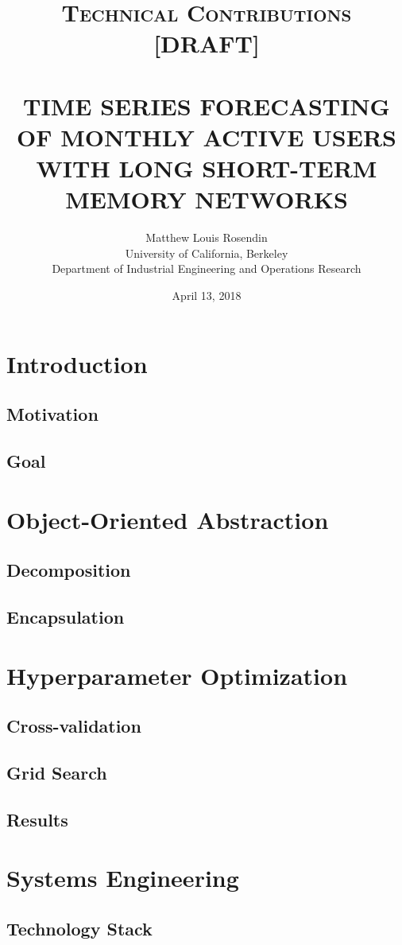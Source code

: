 \documentclass[11pt, oneside]{article}
\title{
  \normalsize \textsc{Technical Contributions [DRAFT]} \\ [2.0cm]
  \HRule{0.5pt} \\
  \LARGE \textbf{\uppercase{
    Time Series Forecasting of Monthly Active Users with Long Short-Term Memory
    Networks
  }}
  \HRule{2pt} \\ [0.5cm]
  \vspace*{5\baselineskip}
}
\author{
  Matthew Louis Rosendin \\
  University of California, Berkeley \\
  Department of Industrial Engineering and Operations Research
}
\date{April 13, 2018}
\begin{document}
\maketitle
\newpage

\tableofcontents
\newpage

\section{Introduction}
\subsection{Motivation}
\subsection{Goal}

\section{Object-Oriented Abstraction}
\subsection{Decomposition}
\subsection{Encapsulation}

\section{Hyperparameter Optimization}
\subsection{Cross-validation}
\subsection{Grid Search}
\subsection{Results}

\section{Systems Engineering}
\subsection{Technology Stack}
\end{document}
